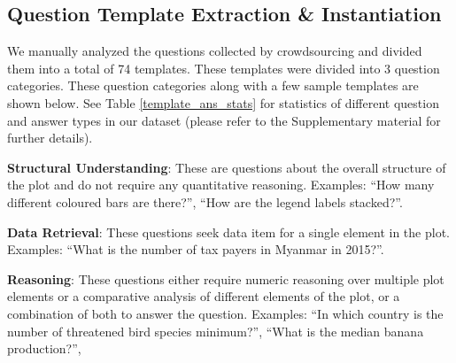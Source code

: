 \documentclass[10pt,twocolumn,letterpaper]{article}
\begin{document}


\subsection{Question Template Extraction \& Instantiation}

We manually analyzed the questions collected by crowdsourcing and divided them into a total of 74 templates. %
These templates were divided into 3 question categories. 
These question categories along with a few sample templates are shown below. See Table \ref{template_ans_stats} for statistics of different question and answer types in our dataset (please refer to the Supplementary material for further details).

\noindent\textbf{Structural Understanding}: 
    These are questions about the overall structure of the plot and do not require any quantitative reasoning. 
    Examples: ``How many different coloured bars are there?'', ``How are the legend labels stacked?''.

\noindent\textbf{Data Retrieval}:
    These questions seek data item for a single element in the plot.
    Examples: ``What is the number of tax payers in Myanmar in 2015?''.%

\noindent\textbf{Reasoning}: 
    These questions either require numeric reasoning over multiple plot elements or a comparative analysis of different elements of the plot, or a combination of both to answer the question. 
    Examples: 
    ``In which country is the number of threatened bird species minimum?'', 
    ``What is the median banana production?'', 
\end{document}
